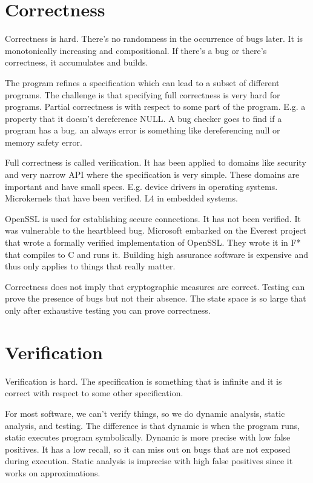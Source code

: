 \documentclass[twoside]{article}
\begin{document}
\section{Correctness}

Correctness is hard. There’s no randomness in the occurrence of bugs later. It is monotonically increasing and compositional. If there’s a bug or there’s correctness, it accumulates and builds. 

The program refines a specification which can lead to a subset of different programs. The challenge is that specifying full correctness is very hard for programs. Partial correctness is with respect to some part of the program.  E.g. a property that it doesn’t dereference NULL. A bug checker goes to find if a program has a bug. an always error is something like dereferencing null or memory safety error. 

Full correctness is called verification. It has been applied to domains like security and very narrow API where the specification is very simple. These domains are important and have small specs. E.g. device drivers in operating systems. Microkernels that have been verified. L4 in embedded systems. 

OpenSSL is used for establishing secure connections. It has not been verified. It was vulnerable to the heartbleed bug. Microsoft embarked on the Everest project that wrote a formally verified implementation of OpenSSL.  They wrote it in F* that compiles to C and runs it. Building high assurance software is expensive and thus only applies to things that really matter. 

Correctness does not imply that cryptographic measures are correct. Testing can prove the presence of bugs but not their absence. The state space is so large that only after exhaustive testing you can prove correctness. 

\section{Verification}

Verification is hard. The specification is something that is infinite and it is correct with respect to some other specification.  

For most software, we can’t verify things, so we do dynamic analysis, static analysis, and testing. The difference is that dynamic is when the program runs, static executes program symbolically. Dynamic is more precise with low false positives. It has a low recall, so it can miss out on bugs that are not exposed during execution. Static analysis is imprecise with high false positives since it works on approximations. 
\end{document}

